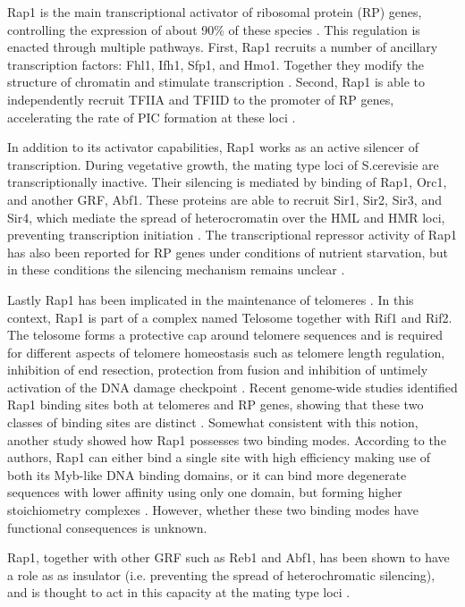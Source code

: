 Rap1 is the main transcriptional activator of ribosomal protein (RP) genes, controlling the expression of about 90\% of these species \cite{moehle:1991:association}. 
This regulation is enacted through multiple pathways.
First, Rap1 recruits a number of ancillary transcription factors: Fhl1, Ifh1, Sfp1, and Hmo1. Together they modify the structure of chromatin and stimulate transcription \cite{reja:2015:molecular}. 
Second, Rap1 is able to independently recruit TFIIA and TFIID to the promoter of RP genes, accelerating the rate of PIC formation at these loci \cite{papai:2010:tfiia}.


In addition to its activator capabilities, Rap1 works as an active silencer of transcription. 
During vegetative growth, the mating type loci of S.cerevisie are transcriptionally inactive. 
Their silencing is mediated by binding of Rap1, Orc1, and another GRF, Abf1. 
These proteins are able to recruit Sir1, Sir2, Sir3, and Sir4, which mediate the spread of heterocromatin over the HML and HMR loci, preventing transcription initiation \cite{kurtz:1991:rap1}. 
The transcriptional repressor activity of Rap1 has also been reported for RP genes under conditions of nutrient starvation, but in these conditions the silencing mechanism remains unclear \cite{reja:2015:molecular}. 


Lastly Rap1 has been implicated in the maintenance of telomeres \cite{lustig:1990:involvement}. 
In this context, Rap1 is part of a complex named Telosome together with Rif1 and Rif2. 
The telosome forms a protective cap around telomere sequences and is required for different aspects of telomere homeostasis such as telomere length regulation, inhibition of end resection, protection from fusion and inhibition of untimely activation of the DNA damage checkpoint \cite[for review see][]{wellinger:2012:everything}. 
Recent genome-wide studies identified Rap1 binding sites both at telomeres and RP genes, showing that these two classes of binding sites are distinct \cite{rhee:2011:comprehensive}. 
Somewhat consistent with this notion, another study showed how Rap1 possesses two binding modes. 
According to the authors, Rap1 can either bind a single site with high efficiency making use of both its Myb-like DNA binding domains, or it can bind more degenerate sequences with lower affinity using only one domain, but forming higher stoichiometry complexes \cite{feldmann:2014:dnabinding}. 
However, whether these two binding modes have functional consequences is unknown.

Rap1, together with other GRF such as Reb1 and Abf1, has been shown to have a role as as insulator (i.e. preventing the spread of heterochromatic silencing), and is thought to act in this capacity at the mating type loci \cite{fourel:2002:general}.



